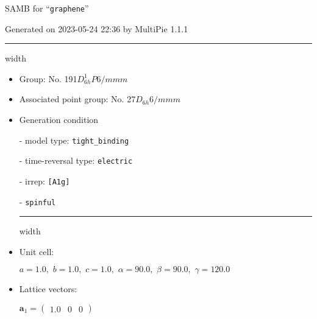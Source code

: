 \documentclass[fleqn,10pt,landscape]{article}
\begin{document}
\setcounter{MaxMatrixCols}{16}

\setlength{\baselineskip}{16pt}
\footnotesize
\begin{center}
\LARGE
SAMB for ``\texttt{graphene}''
\end{center}
\begin{flushright}
Generated on 2023-05-24 22:36 by MultiPie 1.1.1
\end{flushright}
\vspace{1cm}


 \hfil \hrule height 1mm width \textwidth \hfil

\begin{itemize}
\item Group: No. 191\quad$D_{6h}^{1}$\quad$P6/mmm$\quad[ hexagonal ]

\item Associated point group: No. 27\quad$D_{6h}$\quad$6/mmm$\quad[ hexagonal ]

\vspace{5mm}

\item Generation condition

\quad - model type: \texttt{tight_binding}

\quad - time-reversal type: \texttt{electric}

\quad - irrep: \texttt{[A1g]}

\quad - \texttt{spinful}


 \hfil \hrule height 1mm width \textwidth \hfil

\item Unit cell:

\quad $a=1.0,\,\, b=1.0,\,\, c=1.0,\,\, \alpha=90.0,\,\, \beta=90.0,\,\, \gamma=120.0$

\item Lattice vectors:

\quad $\bm{a}_1=\begin{pmatrix} 1.0 & 0 & 0 \end{pmatrix}$


\end{itemize}
\end{document}
